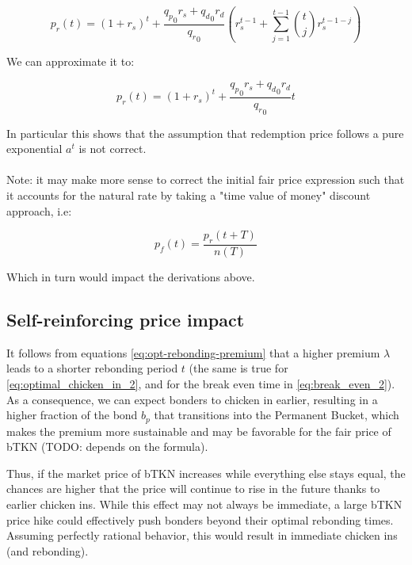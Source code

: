 \documentclass{article}
\begin{document}
\begin{equation}
  \label{eq:conservative_p_r_base_2_a}
p_r(t) = (1+r_s)^t + \frac{{q_p}_0 r_s + {q_d}_0 r_d}{{q_r}_0} \left(r_s^{t-1} + \sum_{j=1}^{t-1} \binom{t}{j} r_s^{t-1-j} \right)
\end{equation}

We can approximate it to:

\begin{equation}
  \label{eq:conservative_p_r_base_2_b}
p_r(t) = (1+r_s)^t + \frac{{q_p}_0 r_s + {q_d}_0 r_d}{{q_r}_0} t
\end{equation}

In particular this shows that the assumption that redemption price follows a pure exponential $a^t$ is not correct.

\paragraph{}

Note: it may make more sense to correct the initial fair price expression such that it accounts for the natural rate by taking a "time value of money" discount approach, i.e:

\begin{equation}
  \label{eq:conservative-1}
p_f(t) = \frac{p_r(t + T)}{n(T)}
\end{equation}

Which in turn would impact the derivations above.

\subsection{Self-reinforcing price impact}
It follows from equations \ref{eq:opt-rebonding-premium} that a higher premium $\lambda$ leads to a shorter rebonding period $t$ (the same is true for \ref{eq:optimal_chicken_in_2}, and for the break even time in \ref{eq:break_even_2}). As a consequence, we can expect bonders to chicken in earlier, resulting in a higher fraction of the bond $b_p$ that transitions into the Permanent Bucket, which makes the premium more sustainable and may be favorable for the fair price of bTKN (TODO: depends on the formula).

Thus, if the market price of bTKN increases while everything else stays equal, the chances are higher that the price will continue to rise in the future thanks to earlier chicken ins. While this effect may not always be immediate, a large bTKN price hike could effectively push bonders beyond their optimal rebonding times.
Assuming perfectly rational behavior, this would result in immediate chicken ins (and rebonding).
\end{document}

